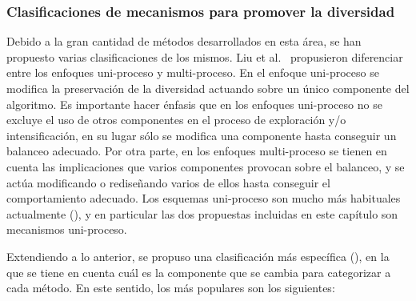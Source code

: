 %
%
%

\subsubsection{Clasificaciones de mecanismos para promover la diversidad}

Debido a la gran cantidad de métodos desarrollados en esta área, se han propuesto varias clasificaciones de los mismos.
%
Liu et al.~\cite{liu2009explore} propusieron diferenciar entre los enfoques uni-proceso y multi-proceso.
%
En el enfoque uni-proceso se modifica la preservación de la diversidad actuando sobre un único componente del algoritmo. 
%
Es importante hacer énfasis que en los enfoques uni-proceso no se excluye el uso de otros componentes en el proceso de exploración y/o intensificación, en su lugar sólo se modifica una componente hasta conseguir un balanceo adecuado.
%
Por otra parte, en los enfoques multi-proceso se tienen en cuenta las implicaciones que varios componentes 
provocan sobre el balanceo, y se actúa modificando o rediseñando varios de ellos hasta conseguir el comportamiento adecuado.
%
Los esquemas uni-proceso son mucho más habituales actualmente (\cite{Crepinsek:13}), y en particular las dos propuestas incluidas en este capítulo son mecanismos
uni-proceso.

Extendiendo a lo anterior, se propuso una clasificación más específica (\cite{Crepinsek:13}), en la que se tiene en cuenta cuál es la componente que se cambia para categorizar a cada método.
%
En este sentido, los más populares son los siguientes:

